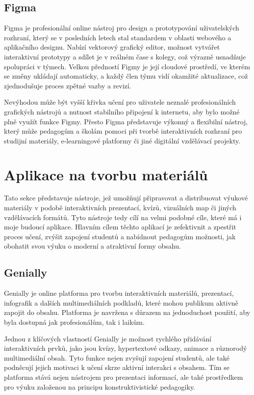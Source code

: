 \subsection{Figma}

Figma je profesionální online nástroj pro design a prototypování uživatelských rozhraní, který se v posledních letech stal standardem v oblasti webového a aplikačního designu. 
Nabízí vektorový grafický editor, možnost vytvářet interaktivní prototypy a sdílet je v reálném čase s kolegy, což výrazně usnadňuje spolupráci v týmech. 
Velkou předností Figmy je její cloudové prostředí, ve kterém se změny ukládají automaticky, a každý člen týmu vidí okamžité aktualizace, což zjednodušuje proces zpětné vazby a revizí. 

Nevýhodou může být vyšší křivka učení pro uživatele neznalé profesionálních grafických nástrojů a nutnost stabilního připojení k internetu, aby bylo možné plně využít funkce Figmy. 
Přesto Figma představuje výkonný a flexibilní nástroj, který může pedagogům a školám pomoci při tvorbě interaktivních rozhraní pro studijní materiály, e-learningové platformy či jiné digitální vzdělávací projekty.

\section{Aplikace na tvorbu materiálů}

Tato sekce představuje nástroje, jež umožňují připravovat a distribuovat výukové materiály v podobě interaktivních prezentací, kvízů, vizuálních map či jiných vzdělávacích formátů.
Tyto nástroje tedy cílí na velmi podobné cíle, které má i moje budoucí aplikace.
Hlavním cílem těchto aplikací je zefektivnit a zpestřit proces učení, zvýšit zapojení studentů a nabídnout pedagogům možnosti, jak obohatit svou výuku o moderní a atraktivní formy obsahu.

\subsection{Genially}

Genially je online platforma pro tvorbu interaktivních materiálů, prezentací, infografik a dalších multimediálních podkladů, které mohou publikum aktivně zapojit do obsahu.
Platforma je navržena s důrazem na jednoduchost použití, aby byla dostupná jak profesionálům, tak i laikům.

Jednou z klíčových vlastností Genially je možnost rychlého přidávání interaktivních prvků, jako jsou kvízy, hypertextové odkazy, animace a různorodý multimediální obsah. 
Tyto funkce nejen zvyšují zapojení studentů, ale také podněcují jejich motivaci k učení skrze aktivní interakci s obsahem. 
Tím se platforma stává nejen nástrojem pro prezentaci informací, ale také prostředkem pro výuku založenou na principu konstruktivistické pedagogiky. 

